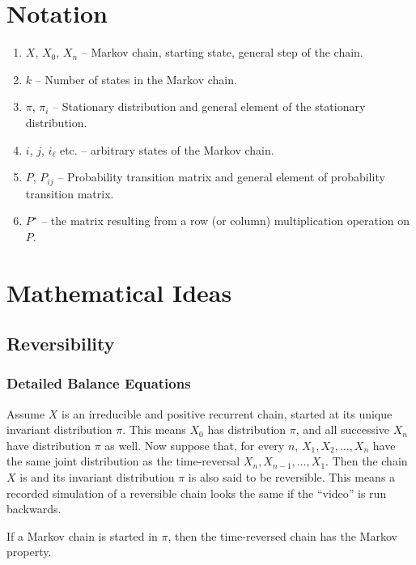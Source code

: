 \documentclass[12pt]{article}
\begin{document}
\section*{Notation}
\begin{enumerate}
\item $X$, $X_0$, $X_n$ -- Markov chain, starting state, general step
  of the chain.
\item $k$ -- Number of states in the Markov chain.
\item $\pi$, $\pi_i$ -- Stationary distribution and general element of
  the stationary distribution.
\item $i$, $j$, $i_{\ell}$ etc. -- arbitrary states of the Markov
  chain.
\item $P$, $P_{ij}$ -- Probability transition matrix and general
  element of probability transition matrix.
\item $P^{\star}$ -- the matrix resulting from a row (or column) multiplication operation on $P$.
\end{enumerate}
\hr

\section*{Mathematical Ideas}
\subsection*{Reversibility}

\subsubsection*{Detailed Balance Equations}

Assume $X$ is an irreducible and positive recurrent chain, started at its unique invariant
distribution $\pi$.  This means $X_0$ has distribution
$\pi$, and all successive $X_n$ have distribution $\pi$ as well.
Now suppose that, for every $n$, $X_1, X_2, \dots , X_n$ have the same joint distribution as the time-reversal
$X_n, X_{n-1}, \dots , X_1$. Then the chain $X$ is
and its invariant distribution $\pi$ is also said to be reversible. This means  a recorded simulation of a reversible
chain looks the same if the ``video'' is run backwards.

\begin{proposition}
  If a Markov chain is started in $\pi$, then the time-reversed chain
  has the Markov property.
\end{proposition}
\end{document}
